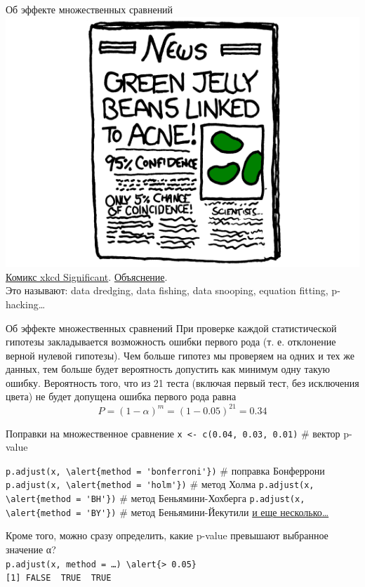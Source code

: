 \begin{frame}{Об эффекте множественных сравнений}
\vfill
\includegraphics[width=0.8\linewidth]{jellybeanexample3.png}\\
\href{https://xkcd.com/882/}{\alert{Комикс xkcd Significant}}. \href{http://www.explainxkcd.com/wiki/index.php/882}{\alert{Объяснение}}.\\
Это называют: data dredging, data fishing, data snooping, equation fitting, p-hacking\dots
\end{frame}
\begin{frame}{Об эффекте множественных сравнений}
При проверке каждой статистической гипотезы закладывается возможность ошибки первого рода (т. е. отклонение верной нулевой гипотезы). Чем больше гипотез мы проверяем на одних и тех же данных, тем больше будет вероятность допустить как минимум одну такую ошибку.  Вероятность того, что из 21 теста (включая первый тест, без исключения цвета) не будет допущена ошибка первого рода равна 
$$P = (1-\alpha)^m = (1 - 0.05)^{21} = 0.34$$
\end{frame}
\begin{frame}{Поправки на множественное сравнение}
\scriptsize \verb"x <- c(0.04, 0.03, 0.01)" \normalsize \hfill \# вектор p-value\\
\begin{itemize}
\mytem \scriptsize \verb"p.adjust(x, \alert{method = 'bonferroni'})" \normalsize \hfill \# поправка Бонферрони\\
\mytem \scriptsize \verb"p.adjust(x, \alert{method = 'holm'})" \normalsize \hfill \# метод Холма
\mytem \scriptsize \verb"p.adjust(x, \alert{method = 'BH'})" \normalsize \hfill \# метод Беньямини-Хохберга
\mytem \scriptsize \verb"p.adjust(x, \alert{method = 'BY'})" \normalsize \hfill \# метод Беньямини-Йекутили
\mytem \href{http://stats.stackexchange.com/a/71491}{\alert{и еще несколько…}}
\end{itemize}
\vfill
Кроме того, можно сразу определить, какие p-value превышают выбранное значение α?\medskip\\
\scriptsize \verb"p.adjust(x, method = …) \alert{> 0.05}"\\
\verb"[1] FALSE  TRUE  TRUE" \normalsize
\end{frame}
